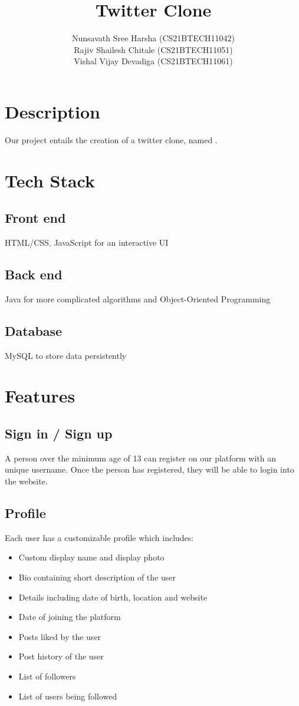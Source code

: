 \documentclass[journal,12pt,onecolumn]{IEEEtran}
\title{\color{teal}Twitter Clone}
\author{Nunsavath Sree Harsha (CS21BTECH11042) \\ Rajiv Shailesh Chitale (CS21BTECH11051) \\ Vishal Vijay Devadiga (CS21BTECH11061)}
\begin{document}
\maketitle

\section*{\textbf{Description}}
Our project entails the creation of a twitter clone, named {\color{teal}}.


\section*{\textbf{Tech Stack}}
\subsection*{\textbf{Front end}} HTML/CSS, JavaScript for an interactive UI
\subsection*{\textbf{Back end}} Java for more complicated algorithms and Object-Oriented Programming
\subsection*{\textbf{Database}} MySQL to store data persistently

\section*{\textbf{Features}} 
\subsection*{\textbf{Sign in / Sign up}}
\noindent A person over the minimum age of 13 can register on our platform with an unique username.
Once the person has registered, they will be able to login into the website.
%
\subsection*{\textbf{Profile}}
\noindent Each user has a customizable profile which includes:
\begin{itemize}
    \item Custom display name and display photo
    \item Bio containing short description of the user
    \item Details including date of birth, location and website
    \item Date of joining the platform
    \item Posts liked by the user
    \item Post history of the user
    \item List of followers
    \item List of users being followed
\end{itemize}
%
\end{document}
